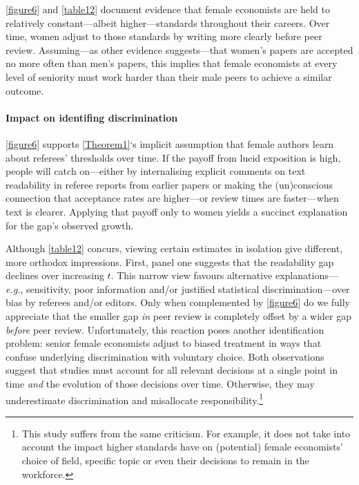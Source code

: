 \autoref{figure6} and \autoref{table12} document evidence that female economists are held to relatively constant---albeit higher---standards throughout their careers. Over time, women adjust to those standards by writing more clearly before peer review. Assuming---as other evidence suggests---that women's papers are accepted no more often than men's papers, this implies that female economists at every level of seniority must work harder than their male peers to achieve a similar outcome.

\paragraph{Impact on identifing discrimination}
\label{identificationimpact}

\autoref{figure6} supports \autoref{Theorem1}`s implicit assumption that female authors learn about referees' thresholds over time. If the payoff from lucid exposition is high, people will catch on---either by internalising explicit comments on text readability in referee reports from earlier papers or making the (un)conscious connection that acceptance rates are higher---or review times are faster---when text is clearer. Applying that payoff only to women yields a succinct explanation for the gap's observed growth.

Although \autoref{table12} concurs, viewing certain estimates in isolation give different, more orthodox impressions. First, panel one suggests that the readability gap declines over increasing $t$. This narrow view favours alternative explanations---\emph{e.g.}, sensitivity, poor information and\slash or justified statistical discrimination---over bias by referees and\slash or editors. Only when complemented by \autoref{figure6} do we fully appreciate that the smaller gap \emph{in} peer review is completely offset by a wider gap \emph{before} peer review. Unfortunately, this reaction poses another identification problem: senior female economists adjust to biased treatment in ways that confuse underlying discrimination with voluntary choice. Both observations suggest that studies must account for all relevant decisions at a single point in time \emph{and} the evolution of those decisions over time. Otherwise, they may underestimate discrimination and misallocate responsibility.\footnote{This study suffers from the same criticism. For example, it does not take into account the impact higher standards have on (potential) female economists' choice of field, specific topic or even their decisions to remain in the workforce.} 

